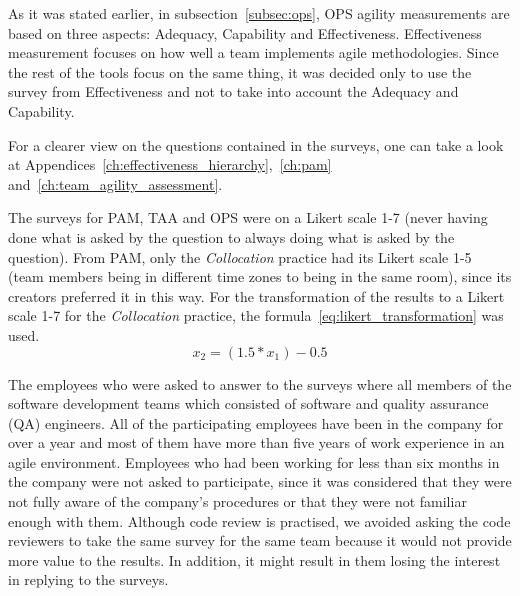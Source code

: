 
As it was stated earlier, in subsection~\ref{subsec:ops}, \ac{OPS} agility measurements are based on three aspects: Adequacy, Capability and Effectiveness. Effectiveness measurement focuses on how well a team implements agile methodologies. Since the rest of the tools focus on the same thing, it was decided only to use the survey from Effectiveness and not to take into account the Adequacy and Capability.

For a clearer view on the questions contained in the surveys, one can take a look at Appendices~\ref{ch:effectiveness_hierarchy},~\ref{ch:pam} and~\ref{ch:team_agility_assessment}.

The surveys for \ac{PAM}, \ac{TAA} and \ac{OPS} were on a Likert scale 1-7 (never having done what is asked by the question to always doing what is asked by the question). From \ac{PAM}, only the \textit{Collocation} practice had its Likert scale 1-5 (team members being in different time zones to being in the same room), since its creators preferred it in this way. For the transformation of the results to a Likert scale 1-7 for the \textit{Collocation} practice, the formula~\eqref{eq:likert_transformation} \cite{likert_transformation} was used.  \begin{equation} \label{eq:likert_transformation} x_2 = (1.5 * x_1) - 0.5 \end{equation} 

The employees who were asked to answer to the surveys where all members of the software development teams which consisted of software and quality assurance (QA) engineers. All of the participating employees have been in the company for over a year and most of them have more than five years of work experience in an agile environment. Employees who had been working for less than six months in the company were not asked to participate, since it was considered that they were not fully aware of the company's procedures or that they were not familiar enough with them. Although code review is practised, we avoided asking the code reviewers to take the same survey for the same team because it would not provide more value to the results. In addition, it might result in them losing the interest in replying to the surveys. 


